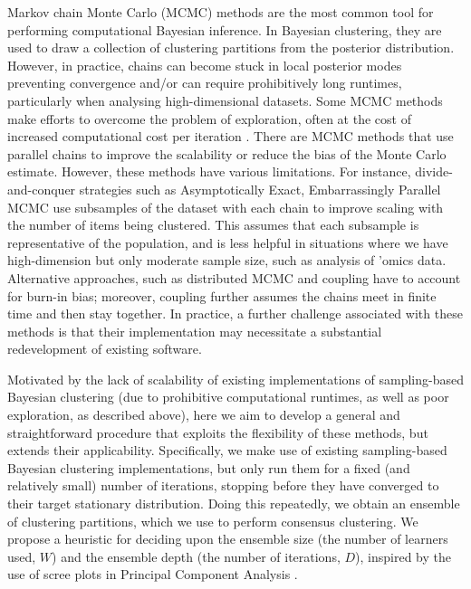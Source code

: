 \documentclass{bmcart}
\begin{document}
	Markov chain Monte Carlo (MCMC) methods are the most common tool for performing computational Bayesian inference. In Bayesian clustering, they are used to draw a collection of clustering partitions from the posterior distribution. However, in practice, chains can become stuck in local posterior modes preventing convergence \citep[see, e.g., the Supplementary Materials of][]{strauss2020gpseudoclust} and/or can require prohibitively long runtimes, particularly when analysing high-dimensional datasets. Some MCMC methods make efforts to overcome the problem of exploration, often at the cost of increased computational cost per iteration \cite{robert2018accelerating}.  There are MCMC methods that use parallel chains to improve the scalability or reduce the bias of the Monte Carlo estimate. However, these methods have various limitations. For instance, divide-and-conquer strategies such as Asymptotically Exact, Embarrassingly Parallel MCMC \citep{NeiswangerAsymptoticallyExactEmbarrassingly2014} use subsamples of the dataset with each chain to improve scaling with the number of items being clustered. This assumes that each subsample is representative of the population, and is less helpful in situations where we have high-dimension but only moderate sample size, such as analysis of 'omics data. Alternative approaches, such as distributed MCMC \citep{MurrayDistributedMarkovchain} and coupling \citep{JacobUnbiasedMarkovchain2020} have to account for burn-in bias; moreover, coupling further assumes the chains meet in finite time and then stay together. In practice, a further challenge associated with these methods is that their implementation may necessitate a substantial redevelopment of existing software.
	
	Motivated by the lack of scalability of existing implementations of sampling-based Bayesian clustering (due to prohibitive computational runtimes, as well as poor exploration, as described above), here we aim to develop a general and straightforward procedure that exploits the flexibility of these methods, but extends their applicability. Specifically, we make use of existing sampling-based Bayesian clustering implementations, but only run them for a fixed (and relatively small) number of iterations, stopping before they have converged to their target stationary distribution. Doing this repeatedly, we obtain an ensemble of clustering partitions, which we use to perform consensus clustering. We propose a heuristic for deciding upon the ensemble size (the number of learners used, $W$) and the ensemble depth (the number of iterations, $D$), inspired by the use of scree plots in Principal Component Analysis \citep[\textbf{PCA};][]{wold1987principal}.  
		
\end{document}
